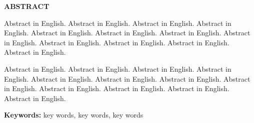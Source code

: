 \thispagestyle{plain}
{}

\centerline{\bfseries ABSTRACT}

\linespread{1.4}
\bigskip


Abstract in English. Abstract in English. Abstract in English.
Abstract in English. Abstract in English. Abstract in English.
Abstract in English. Abstract in English. Abstract in English.
Abstract in English. Abstract in English. Abstract in English.

Abstract in English. Abstract in English. Abstract in English.
Abstract in English. Abstract in English. Abstract in English.
Abstract in English. Abstract in English. Abstract in English.
Abstract in English. Abstract in English. Abstract in English.


\bigskip
\noindent\textbf{ Keywords:}
key words, key words, key words
